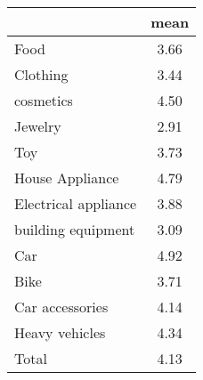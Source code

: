 {
\def\sym#1{\ifmmode^{#1}\else\(^{#1}\)\fi}
\begin{tabular}{l*{1}{c}}
\hline\hline
            &        mean\\
\hline
Food        &        3.66\\
Clothing    &        3.44\\
cosmetics   &        4.50\\
Jewelry     &        2.91\\
Toy         &        3.73\\
House Appliance&        4.79\\
Electrical appliance&        3.88\\
building equipment&        3.09\\
Car         &        4.92\\
Bike        &        3.71\\
Car accessories&        4.14\\
Heavy vehicles&        4.34\\
Total       &        4.13\\
\hline\hline
\end{tabular}
}

